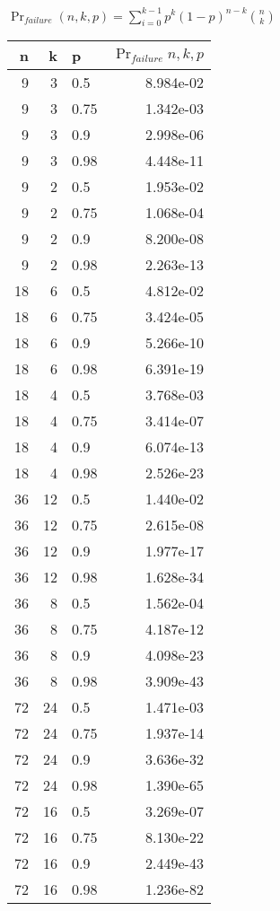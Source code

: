 \documentclass[a4paper,10pt]{article}
\begin{document}
\vspace{2cm}
{\centering
$\Pr_{failure}(n,k,p) = \displaystyle \sum_{i=0}^{k-1} p^{k}(1-p)^{n-k }{n \choose k}$
\\}
\vspace{3cm}
\begin{table}[hbt!]
\begin{center}
\begin{tabular}{r r l r}
n & k & p & $\Pr_{failure}{n,k,p}$\\
\hline  9&  3&    0.5  &  8.984e-02 \\
\hline  9&  3&    0.75& 1.342e-03\\
\hline  9&  3&    0.9  &  2.998e-06\\
\hline  9&  3&    0.98& 4.448e-11\\
\hline  9&  2&    0.5  &  1.953e-02\\
\hline  9&  2&    0.75& 1.068e-04\\
\hline  9&  2&    0.9  &  8.200e-08\\
\hline  9&  2&    0.98& 2.263e-13\\
\hline  18& 6&   0.5  & 4.812e-02\\
\hline  18& 6&   0.75&3.424e-05\\
\hline  18& 6&   0.9  & 5.266e-10\\
\hline  18& 6&   0.98&6.391e-19\\
\hline  18& 4&   0.5  & 3.768e-03\\
\hline  18& 4&   0.75&3.414e-07\\
\hline  18& 4&   0.9  & 6.074e-13\\
\hline  18& 4&   0.98&2.526e-23\\
\hline  36& 12& 0.5  &1.440e-02\\
\hline  36& 12&  0.75&2.615e-08\\
\hline  36& 12&  0.9  &1.977e-17\\
\hline  36& 12&  0.98&1.628e-34\\
\hline  36&  8&   0.5  & 1.562e-04\\
\hline  36& 8&   0.75 &4.187e-12\\
\hline  36& 8&   0.9  & 4.098e-23\\
\hline  36& 8&   0.98 &3.909e-43\\
\hline  72& 24& 0.5  &1.471e-03\\
\hline  72& 24& 0.75&1.937e-14\\
\hline  72& 24& 0.9  &3.636e-32\\
\hline  72& 24& 0.98&1.390e-65\\
\hline  72& 16& 0.5  &3.269e-07\\
\hline  72& 16& 0.75&8.130e-22\\
\hline  72& 16& 0.9  &2.449e-43\\
\hline  72& 16& 0.98&1.236e-82\\
\hline  
\end{tabular}
\end{center}
\end{table}
\end{document}
